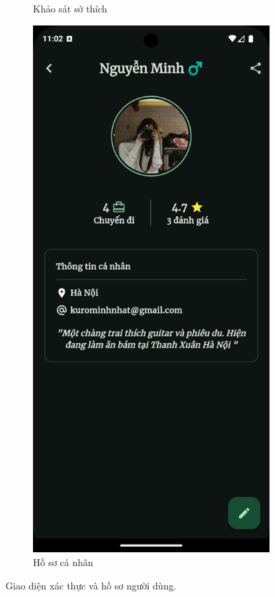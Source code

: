 \begin{figure}[H]
\begin{subfigure}{0.326\textwidth}
        \caption{Khảo sát sở thích}
        \label{fig:func_pref}
    \end{subfigure}
    \hfill
    \begin{subfigure}{0.326\textwidth}
        \includegraphics[width=1\linewidth]{figures/c4/system_func/profile.png}
        \caption{Hồ sơ cá nhân}
        \label{fig:func_profile}
    \end{subfigure}
    \caption{Giao diện xác thực và hồ sơ người dùng.}
    \label{fig:auth-screen}
\end{figure}

